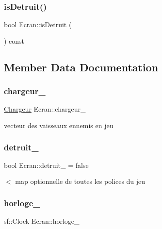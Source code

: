 \subsubsection{\texorpdfstring{is\+Detruit()}{isDetruit()}}
{\footnotesize\ttfamily bool Ecran\+::is\+Detruit (\begin{DoxyParamCaption}{ }\end{DoxyParamCaption}) const\hspace{0.3cm}{\ttfamily [inline]}}



\subsection{Member Data Documentation}
\mbox{\label{class_ecran_a0ae817b129b8dab74f33bf2a1bf05cc5}} 
\subsubsection{\texorpdfstring{chargeur\+\_\+}{chargeur\_}}
{\footnotesize\ttfamily \mbox{\hyperlink{class_chargeur}{Chargeur}} Ecran\+::chargeur\+\_\+\hspace{0.3cm}{\ttfamily [protected]}}



vecteur des vaisseaux ennemis en jeu 

\mbox{\label{class_ecran_a0a1c7e8dd7bea72c322b910d33667be8}} 
\subsubsection{\texorpdfstring{detruit\+\_\+}{detruit\_}}
{\footnotesize\ttfamily bool Ecran\+::detruit\+\_\+ = false\hspace{0.3cm}{\ttfamily [protected]}}



$<$ map optionnelle de toutes les polices du jeu 

\mbox{\label{class_ecran_ac31400b0f55cd0892516edf787dc1751}} 
\subsubsection{\texorpdfstring{horloge\+\_\+}{horloge\_}}
{\footnotesize\ttfamily sf\+::\+Clock Ecran\+::horloge\+\_\+\hspace{0.3cm}{\ttfamily [protected]}}



